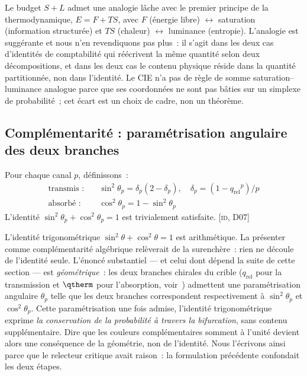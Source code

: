 \documentclass[12pt,a4paper]{article}
\providecommand{\qrel}{\ensuremath{q_{\mathrm{rel}}}}
\begin{document}
\begin{remark}
Le budget $S + L$ admet une analogie l\^ache avec le premier principe
de la thermodynamique, $E = F + TS$, avec $F$ (\'energie libre)
$\leftrightarrow$ saturation (information structur\'ee) et $TS$
(chaleur) $\leftrightarrow$ luminance (entropie). L'analogie est
sugg\'erante et nous n'en revendiquons pas plus~: il s'agit dans les
deux cas d'identit\'es de comptabilit\'e qui r\'e\'ecrivent la m\^eme
quantit\'e selon deux d\'ecompositions, et dans les deux cas le
contenu physique r\'eside dans la quantit\'e partitionn\'ee, non dans
l'identit\'e. Le CIE n'a pas de r\`egle de somme saturation--luminance
analogue parce que ses coordonn\'ees ne sont pas b\^aties sur un
simplexe de probabilit\'e~; cet \'ecart est un choix de cadre, non un
th\'eor\`eme.
\end{remark}

\subsection{Compl\'ementarit\'e : param\'etrisation angulaire des deux branches}

\begin{identitybox}
Pour chaque canal $p$, d\'efinissons~:
\begin{align}
  \text{transmis~:} & \quad \sin^2\!\theta_p = \delta_p(2-\delta_p),
    \quad \delta_p = (1-\qrel^p)/p \\
  \text{absorb\'e~:} & \quad \cos^2\!\theta_p = 1 - \sin^2\!\theta_p
\end{align}
L'identit\'e $\sin^2\!\theta_p + \cos^2\!\theta_p = 1$ est
trivialement satisfaite. \textsc{[id, D07]}
\end{identitybox}

\begin{remark}
L'identit\'e trigonom\'etrique $\sin^2\theta + \cos^2\theta = 1$ est
arithm\'etique. La pr\'esenter comme \og compl\'ementarit\'e
alg\'ebrique \fg{} rel\`everait de la surench\`ere~: rien ne d\'ecoule
de l'identit\'e seule. L'\'enonc\'e substantiel --- et celui dont
d\'epend la suite de cette section --- est \emph{g\'eom\'etrique}~:
les deux branches chirales du crible ($\qrel$ pour la transmission et
$\qtherm$ pour l'absorption, voir~\cite[Ch.~8]{senez2026math})
admettent une param\'etrisation angulaire $\theta_p$ telle que les
deux branches correspondent respectivement \`a $\sin^2\theta_p$ et
$\cos^2\theta_p$. Cette param\'etrisation une fois admise, l'identit\'e
trigonom\'etrique exprime \emph{la conservation de la probabilit\'e \`a
travers la bifurcation}, sans contenu suppl\'ementaire. Dire que \og
les couleurs compl\'ementaires somment \`a l'unit\'e \fg{} devient
alors une cons\'equence de la g\'eom\'etrie, non de l'identit\'e. Nous
l'\'ecrivons ainsi parce que le relecteur critique avait raison~: la
formulation pr\'ec\'edente confondait les deux \'etapes.
\end{remark}
\end{document}
